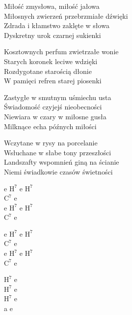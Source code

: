 \begin{text}
    Miłość zmysłowa, miłość jałowa\\
    Miłosnych zwierzeń przebrzmiałe dźwięki\\
    Zdrada i kłamstwo zaklęte w słowa\\
    Dyskretny urok czarnej sukienki

    Kosztownych perfum zwietrzałe wonie\\
    Starych koronek leciwe wdzięki\\
    Rozdygotane starością dłonie\\
    W pamięci refren starej piosenki

    Zastygłe w smutnym uśmiechu usta\\
    Świadomość czyjejś nieobecności\\
    Niewiara w czary w miłosne gusła\\
    Milknące echa późnych miłości

    Wczytane w rysy na porcelanie\\
    Wsłuchane w słabe tony przeszłości\\
    Landszafty wspomnień giną na ścianie\\
    Niemi świadkowie czasów świetności
\end{text}
\begin{chord}
    e $\mathrm{H^{7}}$ e $\mathrm{H^{7}}$\\
    $\mathrm{C^{7}}$ e\\
    e $\mathrm{H^{7}}$ e $\mathrm{H^{7}}$\\
    $\mathrm{C^{7}}$ e

    e $\mathrm{H^{7}}$ e $\mathrm{H^{7}}$\\
    $\mathrm{C^{7}}$ e\\
    e $\mathrm{H^{7}}$ e $\mathrm{H^{7}}$\\
    $\mathrm{C^{7}}$ e

    $\mathrm{H^{7}}$ e\\
    $\mathrm{H^{7}}$ e\\
    $\mathrm{H^{7}}$ e\\
    a e
\end{chord}
